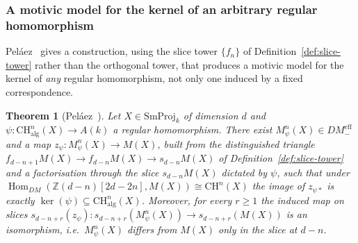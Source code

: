 \documentclass[12pt,a4paper]{article}
\newtheorem{theorem}{Theorem}[section]
\theoremstyle{definition}
\newcommand{\DMeff}{DM^{\mathrm{eff}}_{-}}
\newcommand{\Hom}{\operatorname{Hom}}
\newcommand{\CH}{\mathrm{CH}}
\newcommand{\Z}{\mathbb{Z}}
\newcommand{\SmProj}{\mathrm{SmProj}}
\newcommand{\alg}{\mathrm{alg}}
\begin{document}
\subsubsection{A motivic model for the kernel of an arbitrary regular
homomorphism}

Peláez~\cite{HerPel25} gives a construction, using the slice
tower $\{f_n\}$ of Definition~\ref{def:slice-tower} rather than the orthogonal
tower, that produces a motivic model for the kernel of \emph{any} regular
homomorphism, not only one induced by a fixed correspondence.

\begin{theorem}[Peláez~\cite{HerPel25}]\label{thm:app-abequiv-1}
Let $X\in\SmProj_k$ of dimension $d$ and $\psi:\CH^n_{\alg}(X)\to A(k)$ a
regular homomorphism.  There exist $M^n_\psi(X)\in\DMeff$ and a map
$z_\psi:M^n_\psi(X)\to M(X)$, built from the distinguished triangle
$f_{d-n+1}M(X)\to f_{d-n}M(X)\to s_{d-n}M(X)$ of
Definition~\ref{def:slice-tower} and a factorisation through the slice
$s_{d-n}M(X)$ dictated by $\psi$, such that under
$\Hom_{DM}(\Z(d-n)[2d-2n],M(X))\cong\CH^n(X)$ the image of $z_{\psi\ast}$ is
exactly $\ker(\psi)\subseteq\CH^n_{\alg}(X)$.  Moreover, for every $r\geq 1$
the induced map on slices $s_{d-n+r}(z_\psi):s_{d-n+r}(M^n_\psi(X))\to
s_{d-n+r}(M(X))$ is an isomorphism, i.e.\ $M^n_\psi(X)$ differs from $M(X)$
only in the slice at $d-n$.
\end{theorem}
\end{document}
